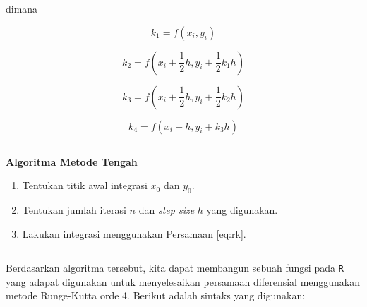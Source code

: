 \documentclass[
]{book}
\providecommand{\tightlist}{%
  \setlength{\itemsep}{0pt}\setlength{\parskip}{0pt}}
\theoremstyle{definition}
\theoremstyle{definition}
\theoremstyle{definition}
\theoremstyle{definition}
\theoremstyle{remark}
\begin{document}
dimana

\begin{equation}
k_1=f\left(x_i,y_i\right)
  \label{eq:rk1}
\end{equation}

\begin{equation}
k_2=f\left(x_i+\frac{1}{2}h,y_i+\frac{1}{2}k_1h\right)
  \label{eq:rk2}
\end{equation}

\begin{equation}
k_3=f\left(x_i+\frac{1}{2}h,y_i+\frac{1}{2}k_2h\right)
  \label{eq:rk3}
\end{equation}

\begin{equation}
k_4=f\left(x_i+h,y_i+k_3h\right)
  \label{eq:rk4}
\end{equation}

\begin{center}\rule{0.5\linewidth}{0.5pt}\end{center}

\textbf{Algoritma Metode Tengah}

\begin{enumerate}
\def\labelenumi{\arabic{enumi}.}
\tightlist
\item
  Tentukan titik awal integrasi \(x_0\) dan \(y_0\).
\item
  Tentukan jumlah iterasi \(n\) dan \emph{step size} \(h\) yang digunakan.
\item
  Lakukan integrasi menggunakan Persamaan \eqref{eq:rk}.
\end{enumerate}

\begin{center}\rule{0.5\linewidth}{0.5pt}\end{center}

Berdasarkan algoritma tersebut, kita dapat membangun sebuah fungsi pada \texttt{R} yang adapat digunakan untuk menyelesaikan persamaan diferensial menggunakan metode Runge-Kutta orde 4. Berikut adalah sintaks yang digunakan:
\end{document}

